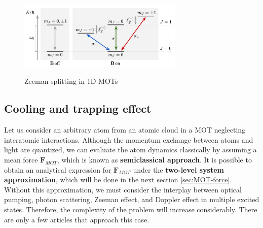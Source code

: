 \begin{figure}[!ht]
	\centering
	\caption{Zeeman splitting in 1D-MOTs}
	\includegraphics[width=0.7\textwidth]{USPSC-img/1D-MOT-Zeeman-splitting.png}
	\vspace{5pt}
	\label{fig:1D-MOT-Zeeman-splitting}
\end{figure}

\subsection{Cooling and trapping effect}
\label{sec:cooling-trapping-effect}

Let us consider an arbitrary atom from an atomic cloud in a MOT neglecting interatomic interactions. Although the momentum exchange between atoms and light are quantized, we can evaluate the atom dynamics classically by assuming a mean force $ \mathbf{F}_{MOT} $, which is known as \textbf{semiclassical approach}. It is possible to obtain an analytical expression for $ \mathbf{F}_{MOT} $ under the \textbf{two-level system approximation}, which will be done in the next section \ref{sec:MOT-force}. Without this approximation, we must consider the interplay between optical pumping, photon scattering, Zeeman effect, and Doppler effect in multiple excited states. Therefore, the complexity of the problem will increase considerably. There are only a few articles \cite{prudnikov2015three, choi2008three, PhysRevA.49.4864} that approach this case.

